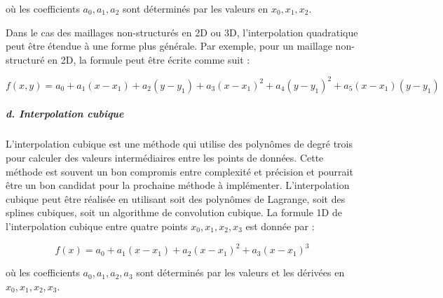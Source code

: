 où les coefficients \( a_0, a_1, a_2 \) sont déterminés par les valeurs en \( x_0, x_1, x_2 \).

Dans le cas des maillages non-structurés en 2D ou 3D, l'interpolation quadratique peut être étendue à une forme plus générale. Par exemple, pour un maillage non-structuré en 2D, la formule peut être écrite comme suit :

\begin{equation}
    f(x, y) = a_0 + a_1(x - x_1) + a_2(y - y_1) + a_3(x - x_1)^2 + a_4(y - y_1)^2 + a_5(x - x_1)(y - y_1)
\end{equation}


\subparagraph{d. Interpolation cubique \cite{tanaka}}
L'interpolation cubique est une méthode qui utilise des polynômes de degré trois pour calculer des valeurs intermédiaires entre les points de données. Cette méthode est souvent un bon compromis entre complexité et précision et pourrait être un bon candidat pour la prochaine méthode à implémenter. L'interpolation cubique peut être réalisée en utilisant soit des polynômes de Lagrange, soit des splines cubiques, soit un algorithme de convolution cubique.
La formule 1D de l'interpolation cubique entre quatre points \( x_0, x_1, x_2, x_3 \) est donnée par :

\begin{equation}
    f(x) = a_0 + a_1(x - x_1) + a_2(x - x_1)^2 + a_3(x - x_1)^3
\end{equation}

où les coefficients \( a_0, a_1, a_2, a_3 \) sont déterminés par les valeurs et les dérivées en \( x_0, x_1, x_2, x_3 \).


